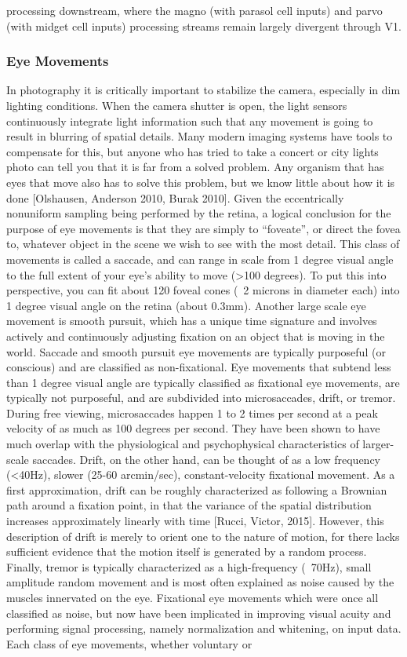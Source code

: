 processing downstream, where the magno (with parasol cell inputs) and parvo (with midget cell inputs) processing streams remain largely divergent through V1.

\subsubsection{Eye Movements} In photography it is critically important to stabilize the camera, especially in dim lighting conditions. When the camera shutter is open, the light sensors continuously integrate light information such that any movement is going to result in blurring of spatial details. Many modern imaging systems have tools to compensate for this, but anyone who has tried to take a concert or city lights photo can tell you that it is far from a solved problem. Any organism that has eyes that move also has to solve this problem, but we know little about how it is done [Olshausen, Anderson 2010, Burak 2010]. Given the eccentrically nonuniform sampling being performed by the retina, a logical conclusion for the purpose of eye movements is that they are simply to “foveate”, or direct the fovea to, whatever object in the scene we wish to see with the most detail. This class of movements is called a saccade, and can range in scale from 1 degree visual angle to the full extent of your eye’s ability to move (>100 degrees). To put this into perspective, you can fit about 120 foveal cones (~2 microns in diameter each) into 1 degree visual angle on the retina (about 0.3mm). Another large scale eye movement is smooth pursuit, which has a unique time signature and involves actively and continuously adjusting fixation on an object that is moving in the world. Saccade and smooth pursuit eye movements are typically purposeful (or conscious) and are classified as non-fixational. Eye movements that subtend less than 1 degree visual angle are typically classified as fixational eye movements, are typically not purposeful, and are subdivided into microsaccades, drift, or tremor. During free viewing, microsaccades happen 1 to 2  times per second at a peak velocity of as much as 100 degrees per second. They have been shown to have much overlap with the physiological and psychophysical characteristics of larger-scale saccades. Drift, on the other hand, can be thought of as a low frequency (<40Hz), slower (25-60 arcmin/sec), constant-velocity fixational movement. As a first approximation, drift can be roughly characterized as following a Brownian path around a fixation point, in that the variance of the spatial distribution increases approximately linearly with time [Rucci, Victor, 2015]. However, this description of drift is merely to orient one to the nature of motion, for there lacks sufficient evidence that the motion itself is generated by a random process. Finally, tremor is typically characterized as a high-frequency (~70Hz), small amplitude random movement and is most often explained as noise caused by the muscles innervated on the eye. Fixational eye movements which were once all classified as noise, but now have been implicated in improving visual acuity and performing signal processing, namely normalization and whitening, on input data. Each class of eye movements, whether voluntary or 